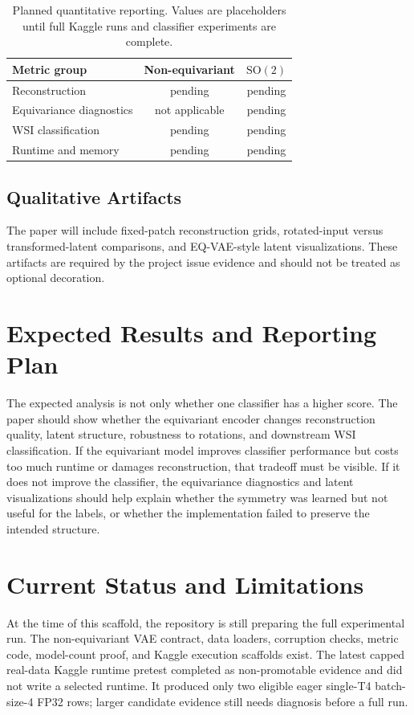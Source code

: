 \documentclass[conference]{IEEEtran}
\begin{document}
\begin{table}[t]
\caption{Planned quantitative reporting. Values are placeholders until full
Kaggle runs and classifier experiments are complete.}
\label{tab:metrics-plan}
\centering
\begin{tabular}{lcc}
\hline
Metric group & Non-equivariant & $\mathrm{SO}(2)$ \\
\hline
Reconstruction & pending & pending \\
Equivariance diagnostics & not applicable & pending \\
WSI classification & pending & pending \\
Runtime and memory & pending & pending \\
\hline
\end{tabular}
\end{table}

\subsection{Qualitative Artifacts}

The paper will include fixed-patch reconstruction grids, rotated-input versus
transformed-latent comparisons, and EQ-VAE-style latent visualizations. These
artifacts are required by the project issue evidence and should not be treated
as optional decoration.

\section{Expected Results and Reporting Plan}

The expected analysis is not only whether one classifier has a higher score.
The paper should show whether the equivariant encoder changes reconstruction
quality, latent structure, robustness to rotations, and downstream WSI
classification. If the equivariant model improves classifier performance but
costs too much runtime or damages reconstruction, that tradeoff must be visible.
If it does not improve the classifier, the equivariance diagnostics and latent
visualizations should help explain whether the symmetry was learned but not
useful for the labels, or whether the implementation failed to preserve the
intended structure.

\section{Current Status and Limitations}

At the time of this scaffold, the repository is still preparing the full
experimental run. The non-equivariant VAE contract, data loaders, corruption
checks, metric code, model-count proof, and Kaggle execution scaffolds exist.
The latest capped real-data Kaggle runtime pretest completed as non-promotable
evidence and did not write a selected runtime. It produced only two eligible
eager single-T4 batch-size-4 FP32 rows; larger candidate evidence still needs
diagnosis before a full run.
\end{document}
